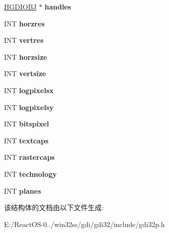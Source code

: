 \begin{DoxyCompactItemize}
\hyperlink{interfacevoid}{H\+G\+D\+I\+O\+BJ} $\ast$ {\bfseries handles}
\item 
\mbox{\label{structtag_e_n_h_m_e_t_a_f_i_l_e_a24000caa5238af7fb29f723c7fc5ccd3}} 
I\+NT {\bfseries horzres}
\item 
\mbox{\label{structtag_e_n_h_m_e_t_a_f_i_l_e_a9330a41183699b1ad18959b175a1b893}} 
I\+NT {\bfseries vertres}
\item 
\mbox{\label{structtag_e_n_h_m_e_t_a_f_i_l_e_acf661ab8de22a48834adf040e095a2d8}} 
I\+NT {\bfseries horzsize}
\item 
\mbox{\label{structtag_e_n_h_m_e_t_a_f_i_l_e_ad3390827b73b4d02095674b079a75135}} 
I\+NT {\bfseries vertsize}
\item 
\mbox{\label{structtag_e_n_h_m_e_t_a_f_i_l_e_a20415cee8c9b9a7e323b20a49e8f5f21}} 
I\+NT {\bfseries logpixelsx}
\item 
\mbox{\label{structtag_e_n_h_m_e_t_a_f_i_l_e_a3e7c000b577db6ecf355e8f684de0eeb}} 
I\+NT {\bfseries logpixelsy}
\item 
\mbox{\label{structtag_e_n_h_m_e_t_a_f_i_l_e_ac665cac68a11b35cf541eb3e6c592d3e}} 
I\+NT {\bfseries bitspixel}
\item 
\mbox{\label{structtag_e_n_h_m_e_t_a_f_i_l_e_ad059d964a273dfd3d6fc55c77feccd23}} 
I\+NT {\bfseries textcaps}
\item 
\mbox{\label{structtag_e_n_h_m_e_t_a_f_i_l_e_a44590744b6369db14b992284fa992122}} 
I\+NT {\bfseries rastercaps}
\item 
\mbox{\label{structtag_e_n_h_m_e_t_a_f_i_l_e_a8b77377cf3b776f11096ccb433a4192a}} 
I\+NT {\bfseries technology}
\item 
\mbox{\label{structtag_e_n_h_m_e_t_a_f_i_l_e_a74a0757e3d16c14ba117ff16c3dac4ed}} 
I\+NT {\bfseries planes}
\end{DoxyCompactItemize}


该结构体的文档由以下文件生成\+:\begin{DoxyCompactItemize}
\item 
E\+:/\+React\+O\+S-\/0../win32ss/gdi/gdi32/include/gdi32p.\+h\end{DoxyCompactItemize}

